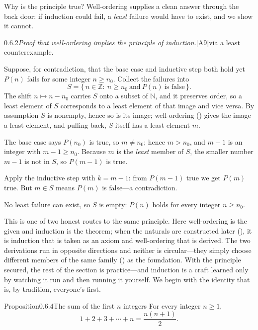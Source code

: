 \documentclass[main.tex]{subfiles}
\begin{document}
\noindent Why is the principle true? Well-ordering supplies a clean answer through the back door: if
induction could fail, a \emph{least} failure would have to exist, and we show it cannot.

\begin{Prf}{0.6.2}{\itshape Proof that well-ordering implies the principle of induction.}{[A9]\enspace via a least counterexample.}
\item Suppose, for contradiction, that the base case and inductive step both hold yet $P(n)$ fails for
some integer $n\ge n_0$. Collect the failures into
\[
S=\{\,n\in\mathbb Z:\ n\ge n_0\ \text{and}\ P(n)\ \text{is false}\,\}.
\]
The shift $n\mapsto n-n_0$ carries $S$ onto a subset of $\mathbb N$, and it preserves order, so a
least element of $S$ corresponds to a least element of that image and vice versa. By assumption $S$ is
nonempty, hence so is its image; well-ordering () gives the image a least element, and
pulling back, $S$ itself has a least element $m$.
\item The base case says $P(n_0)$ is true, so $m\ne n_0$; hence $m>n_0$, and $m-1$ is an integer with
$m-1\ge n_0$. Because $m$ is the \emph{least} member of $S$, the smaller number $m-1$ is not in $S$,
so $P(m-1)$ is true.
\item Apply the inductive step with $k=m-1$: from $P(m-1)$ true we get $P(m)$ true. But $m\in S$ means
$P(m)$ is false---a contradiction.
\item No least failure can exist, so $S$ is empty: $P(n)$ holds for every integer $n\ge n_0$.
\end{Prf}

\noindent This is one of two honest routes to the same principle. Here well-ordering is the given and
induction is the theorem; when the naturals are constructed later (), it is induction that
is taken as an axiom and well-ordering that is derived. The two derivations run in opposite directions
and neither is circular---they simply choose different members of the same family
() as the foundation. With the principle secured, the rest of the section is
practice---and induction is a craft learned only by watching it run and then running it yourself. We
begin with the identity that is, by tradition, everyone's first.

\begin{Obj}{Proposition}{0.6.4}{The sum of the first \texorpdfstring{$n$}{n} integers}
For every integer $n\ge 1$,
\[
1+2+3+\cdots+n=\frac{n(n+1)}{2}.
\]
\end{Obj}
\end{document}
